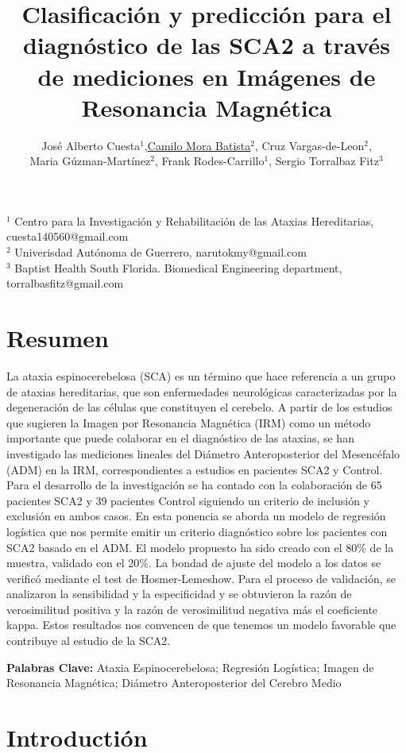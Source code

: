 \documentclass[a4paper,12pt]{article}
\title{Clasificación y predicción para el diagnóstico de las SCA2 a través de mediciones en Imágenes de Resonancia Magnética}
\author{José Alberto Cuesta$^1$,\underline{Camilo Mora Batista}$^2$, Cruz Vargas-de-Leon$^2$, \\ Maria Gúzman-Martínez$^2$, Frank Rodes-Carrillo$^1$, Sergio Torralbaz Fitz$^3$}
\date{}
\begin{document}
	\maketitle
	
	\begin{center}
		$ ^1$ Centro para la Investigación y Rehabilitación de las Ataxias Hereditarias, cuesta140560@gmail.com \\ 
		$^2$ Univerisdad Autónoma de Guerrero, narutokmy@gmail.com\\
		$^3$ Baptist Health South Florida. Biomedical Engineering department, torralbasfitz@gmail.com
	\end{center}
	
\section*{Resumen}
	
	La ataxia espinocerebelosa (SCA) es un término que hace referencia a un grupo de ataxias hereditarias, que son enfermedades neurológicas caracterizadas por la degeneración de las células que constituyen el cerebelo. A partir de los estudios que sugieren la Imagen por Resonancia Magnética (IRM) como un método importante que puede colaborar en el diagnóstico de las ataxias, se han investigado las mediciones lineales del Diámetro Anteroposterior del Mesencéfalo (ADM) en la IRM, correspondientes a estudios en pacientes SCA2 y Control. Para el desarrollo de la investigación se ha contado con la colaboración de 65 pacientes SCA2 y 39 pacientes Control siguiendo un criterio de inclusión y exclusión en ambos casos.  En esta ponencia se aborda un modelo de regresión logística que nos permite emitir un criterio diagnóstico sobre los pacientes con SCA2 basado en el ADM. El modelo propuesto ha sido creado con el 80\% de la muestra, validado con el 20\%. La bondad de ajuste del modelo a los datos se verificó mediante el test de Hosmer-Lemeshow. Para el proceso de validación, se analizaron la sensibilidad y la especificidad y se obtuvieron la razón de verosimilitud positiva y la razón de verosimilitud negativa más el coeficiente kappa. Estos resultados nos convencen de que tenemos un modelo favorable que contribuye al estudio de la SCA2. 
	
	
\textbf{Palabras Clave:}  Ataxia Espinocerebelosa; Regresión Logística; Imagen de Resonancia Magnética; Diámetro Anteroposterior del Cerebro Medio
\section{Introductión}
	
\end{document}
